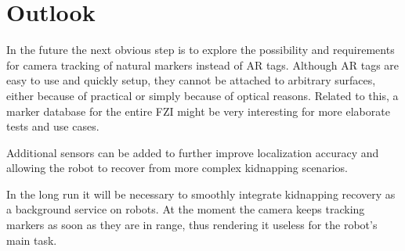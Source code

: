 \section{Outlook}
In the future the next obvious step is to explore the possibility and requirements for camera tracking of natural markers instead of AR tags. Although AR tags are easy to use and quickly setup, they cannot be attached to arbitrary surfaces, either because of practical or simply because of optical reasons. Related to this, a marker database for the entire FZI might be very interesting for more elaborate tests and use cases.

Additional sensors can be added to further improve localization accuracy and allowing the robot to recover from more complex kidnapping scenarios.

In the long run it will be necessary to smoothly integrate kidnapping recovery as a background service on robots. At the moment the camera keeps tracking markers as soon as they are in range, thus rendering it useless for the robot's main task.